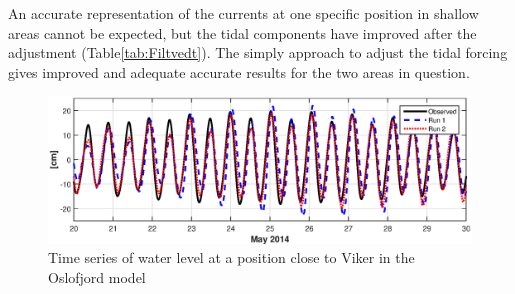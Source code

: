 An accurate representation of the currents at one specific position in shallow areas cannot be expected, but the tidal components have improved after the adjustment (Table\-\ref{tab:Filtvedt}). The simply approach to adjust the tidal forcing gives  improved and adequate accurate results for the two areas in question. 



\begin{figure}[!t]
\centering
\includegraphics[width=\textwidth]{fig_Viker_timeseries}
\caption{Time series of water level at a position close to Viker in the Oslofjord model}
\label{fig:Viker_timeseries}
\end{figure}




